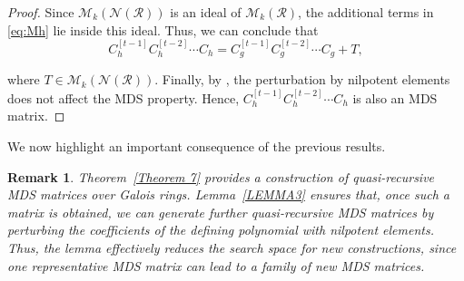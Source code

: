\documentclass[11pt]{article}
\newtheorem{theorem}{Theorem}
\newtheorem{example}{Example}
\newtheorem{remark}{Remark}
\begin{document}
\begin{proof}
Since $\mathcal{M}_k(\mathcal{N}(\mathcal{R}))$ is an ideal of $\mathcal{M}_k(\mathcal{R})$, the additional terms in \eqref{eq:Mh} lie inside this ideal. Thus, we can conclude that
\[
C_h^{[t-1]} C_h^{[t-2]}\cdots C_h = C_g^{[t-1]} C_g^{[t-2]}\cdots C_g + T,
\]

where $T\in \mathcal{M}_k(\mathcal{N}(\mathcal{R}))$.  Finally, by \cite[Theorem 15]{Ali2024block}, the perturbation by nilpotent elements does not affect the MDS property. Hence, $C_h^{[t-1]} C_h^{[t-2]}\cdots C_h$ is also an \textup{MDS} matrix.
\end{proof}
We now highlight an important consequence of the previous results.
\begin{remark}
Theorem~\ref{Theorem 7} provides a construction of quasi-recursive MDS matrices over Galois rings. 
Lemma~\ref{LEMMA3} ensures that, once such a matrix is obtained, 
we can generate further quasi-recursive MDS matrices by perturbing the coefficients of the defining polynomial with nilpotent elements. 
Thus, the lemma effectively reduces the search space for new constructions, since one representative MDS matrix can lead to a family of new MDS matrices.
\end{remark}
 
\end{document}
